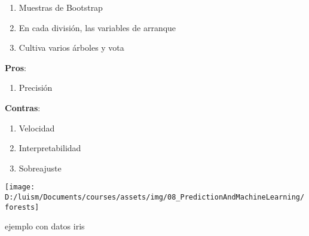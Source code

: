 \documentclass[
]{article}
\newenvironment{Shaded}{\begin{snugshade}}{\end{snugshade}}
\newcommand{\AttributeTok}[1]{\textcolor[rgb]{0.77,0.63,0.00}{#1}}
\newcommand{\ConstantTok}[1]{\textcolor[rgb]{0.00,0.00,0.00}{#1}}
\newcommand{\FloatTok}[1]{\textcolor[rgb]{0.00,0.00,0.81}{#1}}
\newcommand{\FunctionTok}[1]{\textcolor[rgb]{0.00,0.00,0.00}{#1}}
\newcommand{\NormalTok}[1]{#1}
\newcommand{\OtherTok}[1]{\textcolor[rgb]{0.56,0.35,0.01}{#1}}
\newcommand{\SpecialCharTok}[1]{\textcolor[rgb]{0.00,0.00,0.00}{#1}}
\newcommand{\StringTok}[1]{\textcolor[rgb]{0.31,0.60,0.02}{#1}}
\providecommand{\tightlist}{%
  \setlength{\itemsep}{0pt}\setlength{\parskip}{0pt}}
\begin{document}
\begin{enumerate}
\def\labelenumi{\arabic{enumi}.}
\tightlist
\item
  Muestras de Bootstrap
\item
  En cada división, las variables de arranque
\item
  Cultiva varios árboles y vota
\end{enumerate}

\textbf{Pros}:

\begin{enumerate}
\def\labelenumi{\arabic{enumi}.}
\tightlist
\item
  Precisión
\end{enumerate}

\textbf{Contras}:

\begin{enumerate}
\def\labelenumi{\arabic{enumi}.}
\tightlist
\item
  Velocidad
\item
  Interpretabilidad
\item
  Sobreajuste
\end{enumerate}

\begin{center}\texttt{[image: D:/luism/Documents/courses/assets/img/08\_PredictionAndMachineLearning/forests]} \end{center}

ejemplo con datos iris

\begin{Shaded}
\end{Shaded}
\end{document}
